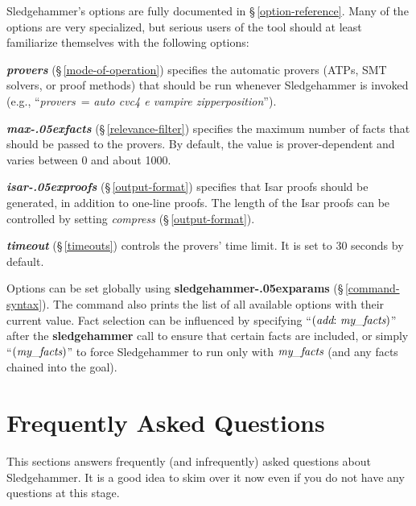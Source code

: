 \documentclass[a4paper,12pt]{article}
\let\oldS=\S
\def\S{\oldS\,}
\renewcommand\_{\hbox{\textunderscore\kern-.05ex}}
\begin{document}

Sledgehammer's options are fully documented in \S\ref{option-reference}. Many of
the options are very specialized, but serious users of the tool should at least
familiarize themselves with the following options:

\begin{enum}
\item[\labelitemi] \textbf{\textit{provers}} (\S\ref{mode-of-operation}) specifies
the automatic provers (ATPs, SMT solvers, or proof methods) that should be run whenever
Sledgehammer is invoked (e.g., ``\textit{provers}~= \textit{auto cvc4 e
vampire zipperposition\/}'').

\item[\labelitemi] \textbf{\textit{max\_facts}} (\S\ref{relevance-filter})
specifies the maximum number of facts that should be passed to the provers. By
default, the value is prover-dependent and varies between 0 and about 1000.

\item[\labelitemi] \textbf{\textit{isar\_proofs}} (\S\ref{output-format}) specifies
that Isar proofs should be generated, in addition to one-line proofs. The length
of the Isar proofs can be controlled by setting \textit{compress}
(\S\ref{output-format}).

\item[\labelitemi] \textbf{\textit{timeout}} (\S\ref{timeouts}) controls the
provers' time limit. It is set to 30 seconds by default.
\end{enum}

Options can be set globally using \textbf{sledgehammer\_params}
(\S\ref{command-syntax}). The command also prints the list of all available
options with their current value. Fact selection can be influenced by specifying
``$(\textit{add}{:}~\textit{my\_facts})$'' after the \textbf{sledgehammer} call
to ensure that certain facts are included, or simply ``$(\textit{my\_facts})$''
to force Sledgehammer to run only with $\textit{my\_facts}$ (and any facts
chained into the goal).


\section{Frequently Asked Questions}
\label{frequently-asked-questions}

This sections answers frequently (and infrequently) asked questions about
Sledgehammer. It is a good idea to skim over it now even if you do not have any
questions at this stage.
\end{document}
